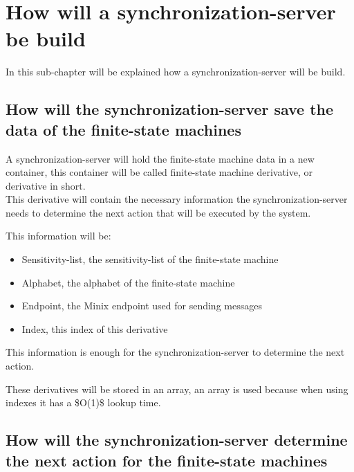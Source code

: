 \hypertarget{how-will-a-synchronization-server-be-build}{%
\section{How will a synchronization-server be
build}\label{how-will-a-synchronization-server-be-build}}

In this sub-chapter will be explained how a synchronization-server will
be build.

\hypertarget{how-will-the-synchronization-server-save-the-data-of-the-finite-state-machines}{%
\subsection{How will the synchronization-server save the data of the
finite-state
machines}\label{how-will-the-synchronization-server-save-the-data-of-the-finite-state-machines}}

A synchronization-server will hold the finite-state machine data in a
new container, this container will be called finite-state machine
derivative, or derivative in short.\\
This derivative will contain the necessary information the
synchronization-server needs to determine the next action that will be
executed by the system.

This information will be:

\begin{itemize}
\tightlist
\item
  Sensitivity-list, the sensitivity-list of the finite-state machine
\item
  Alphabet, the alphabet of the finite-state machine
\item
  Endpoint, the Minix endpoint used for sending messages
\item
  Index, this index of this derivative
\end{itemize}

This information is enough for the synchronization-server to determine
the next action.

These derivatives will be stored in an array, an array is used because
when using indexes it has a \$O(1)\$ lookup time.

\hypertarget{how-will-the-synchronization-server-determine-the-next-action-for-the-finite-state-machines}{%
\subsection{How will the synchronization-server determine the next
action for the finite-state
machines}\label{how-will-the-synchronization-server-determine-the-next-action-for-the-finite-state-machines}}

